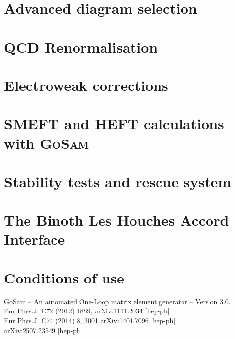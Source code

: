 \documentclass[11pt,a4paper, oneside]{scrbook}
\newcommand{\gosam}{\textsc{GoSam}\xspace}
\begin{document}
\chapter{Advanced diagram selection}


\chapter{QCD Renormalisation}
\label{chp:renormalisation}


\chapter{Electroweak corrections}


\chapter{SMEFT and HEFT calculations with \gosam}
\label{sec:EFT}


\chapter{Stability tests and rescue system}
\label{sec:rescue}


\chapter{The Binoth Les Houches Accord Interface}
\label{sec:blha}


\appendix



\chapter*{Conditions of use}
    GoSam -- An automated One-Loop matrix element generator -- Version 3.0.\\
    Eur.Phys.J. C72 (2012) 1889, arXiv:1111.2034 [hep-ph]\\
    Eur.Phys.J. C74 (2014) 8, 3001 arXiv:1404.7096 [hep-ph]\\
    arXiv:2507.23549 [hep-ph]\\
    
\end{document}
